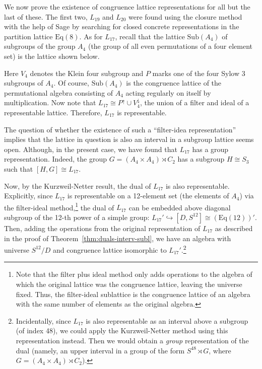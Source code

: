 \documentclass[cm,dissertation,actual,final]{uhthesis}
\theoremstyle{plain}
\theoremstyle{definition}
\theoremstyle{remark}
\numberwithin{theorem}{section}
\numberwithin{claim}{chapter}
\numberwithin{equation}{section}
\numberwithin{conjecture}{chapter}
\newcommand{\<}{\ensuremath{\langle}}
\renewcommand{\>}{\ensuremath{\rangle}}
\newcommand{\Eq}{\ensuremath{\mathrm{Eq}}}
\newcommand{\Sub}{\ensuremath{\mathrm{Sub}}}
\newcommand{\0}{\ensuremath{\mathbf{0}}}
\newcommand{\1}{\ensuremath{\mathbf{1}}}
\newcommand{\2}{\ensuremath{\mathbf{2}}}
\newcommand{\3}{\ensuremath{\mathbf{3}}}
\newcommand{\4}{\ensuremath{\mathbf{4}}}
\newcommand{\5}{\ensuremath{\mathbf{5}}}
\begin{document}
We now prove the existence of congruence lattice representations for all but the
last of these.  The first two, $L_{19}$ and $L_{20}$ were found using the
closure method with the help of Sage by searching for closed concrete
representations in the partition lattice $\Eq(8)$.
As for $L_{17}$, recall that the lattice $\Sub(A_4)$ of
subgroups of the group $A_4$ (the group of all even permutations of a four
element set) is the lattice shown below. 
        \begin{center}
        \end{center}
Here $V_4$ denotes the Klein four subgroup and $P$ marks one of the four Sylow 3
subgroups of $A_4$.
Of course, $\Sub(A_4)$ is the congruence lattice of the permutational algebra
consisting of $A_4$ acting regularly on itself by multiplication.
Now note that $L_{17} \cong P^\uparrow \cup V_4^\downarrow$, the union of a
filter and ideal of a representable lattice. Therefore, $L_{17}$ is representable.

The question of whether the existence of such a ``filter-idea
representation'' implies that the lattice in question is also an interval in a subgroup
lattice seems open.  Although, in the present case, we have found that $L_{17}$
has a group representation.  Indeed, the group 
$G = (A_4 \times A_4) \rtimes C_2$ 
has a subgroup $H\cong S_3$ such that $[H,G]\cong L_{17}$.

%
%
%
Now, by the Kurzweil-Netter result, the dual of $L_{17}$ is also representable.
Explicitly, since $L_{17}$ is representable on a 12-element set (the elements of
$A_4$) via the filter-ideal method,\footnote{Note that the filter plus
  ideal method only adds operations to the algebra of which the original lattice
  was the congruence lattice, leaving the universe fixed.  Thus, the
  filter-ideal sublattice is the congruence lattice of an algebra with the same
  number of elements as the original algebra.} 
the dual of $L_{17}$ can be embedded above diagonal subgroup of the 12-th power
of a simple group: $L_{17}' \hookrightarrow [D,S^{12}] \cong (\Eq(12))'$.
Then, adding the operations from the original representation of $L_{17}$ as
described in the proof of Theorem~\ref{thm:duals-interv-subl}, we have an
algebra with universe $S^{12}/D$ and congruence lattice isomorphic to
$L_{17}'$.\footnote{Incidentally, since $L_{17}$ is also representable as an
  interval above a subgroup (of index 48), we could apply the Kurzweil-Netter
  method using this representation instead.  Then we would obtain a
  \emph{group} representation of the dual (namely, an upper interval in a
  group of the form $S^{48} \rtimes G$, where $G = (A_4 \times A_4) \rtimes C_2$).}
\end{document}
